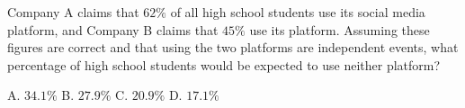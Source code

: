 Company A claims that $62\%$ of all high school students use its social media platform, and Company B claims that $45\%$ use its platform. Assuming these figures are correct and that using the two platforms are independent events, what percentage of high school students would be expected to use neither platform?

A. $34.1\%$ \qquad B. $27.9\%$ \qquad C. $20.9\%$ \qquad D. $17.1\%$
